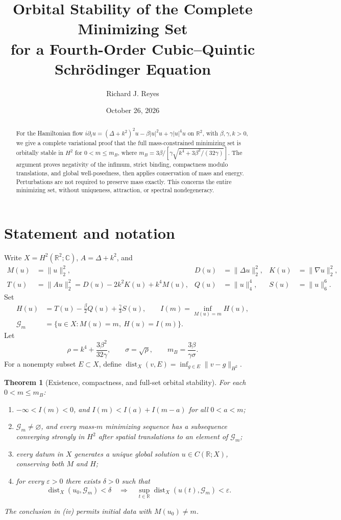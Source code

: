 \documentclass[11pt]{article}
\title{Orbital Stability of the Complete Minimizing Set\\for a Fourth-Order Cubic--Quintic Schr\"odinger Equation}
\author{Richard J. Reyes}
\date{October 26, 2026}
\newtheorem{theorem}{Theorem}
\DeclareMathOperator{\dist}{dist}
\newcommand{\RR}{\mathbb R}
\newcommand{\CC}{\mathbb C}
\newcommand{\HH}{H^2(\RR^2;\CC)}
\newcommand{\nm}[2]{\lVert #1\rVert_{#2}}
\newcommand{\GG}{\mathcal G}
\begin{document}
\maketitle
\begin{abstract}
For the Hamiltonian flow
\(i\partial_tu=(\Delta+k^2)^2u-\beta |u|^2u+\gamma |u|^4u\)
on \(\RR^2\), with \(\beta,\gamma,k>0\), we give a complete
variational proof that the full mass-constrained minimizing set is orbitally
stable in \(H^2\) for \(0<m\le m_B\), where
\(m_B=3\beta/[\gamma\sqrt{k^4+3\beta^2/(32\gamma)}]\).
The argument proves negativity of the infimum, strict binding, compactness
modulo translations, and global well-posedness, then applies conservation
of mass and energy. Perturbations are not required to preserve mass exactly.
This concerns the entire minimizing set, without uniqueness, attraction,
or spectral nondegeneracy.
\end{abstract}

\section{Statement and notation}
Write \(X=\HH\), \(A=\Delta+k^2\), and
\begin{align*}
M(u)&=\nm{u}{2}^2,&D(u)&=\nm{\Delta u}{2}^2,&K(u)&=\nm{\nabla u}{2}^2,\\
T(u)&=\nm{Au}{2}^2=D(u)-2k^2K(u)+k^4M(u),&
Q(u)&=\nm{u}{4}^4,&S(u)&=\nm{u}{6}^6.
\end{align*}
Set
\[
\begin{aligned}
H(u)&=T(u)-\frac{\beta}{2}Q(u)+\frac{\gamma}{3}S(u),\qquad
I(m)=\inf_{M(u)=m}H(u),\\
\GG_m&=\{u\in X:M(u)=m,\ H(u)=I(m)\}.
\end{aligned}
\]
Let
\[
\rho=k^4+\frac{3\beta^2}{32\gamma},\qquad
\sigma=\sqrt\rho,\qquad m_B=\frac{3\beta}{\gamma\sigma}.
\]
For a nonempty subset \(E\subset X\), define
\(\dist_X(v,E)=\inf_{g\in E}\nm{v-g}{H^2}\).

\begin{theorem}[Existence, compactness, and full-set orbital stability]\label{thm:main}
For each \(0<m\le m_B\):
\begin{enumerate}[label=(\roman*)]
\item \(-\infty<I(m)<0\), and \(I(m)<I(a)+I(m-a)\) for all \(0<a<m\);
\item \(\GG_m\ne\varnothing\), and every mass-\(m\) minimizing sequence
has a subsequence converging strongly in \(H^2\) after spatial translations
to an element of \(\GG_m\);
\item every datum in \(X\) generates a unique global solution
\(u\in C(\RR;X)\), conserving both \(M\) and \(H\);
\item for every \(\varepsilon>0\) there exists \(\delta>0\) such that
\[
\dist_X(u_0,\GG_m)<\delta\quad\Longrightarrow\quad
\sup_{t\in\RR}\dist_X(u(t),\GG_m)<\varepsilon.
\]
\end{enumerate}
The conclusion in (iv) permits initial data with \(M(u_0)\ne m\).
\end{theorem}
\end{document}
